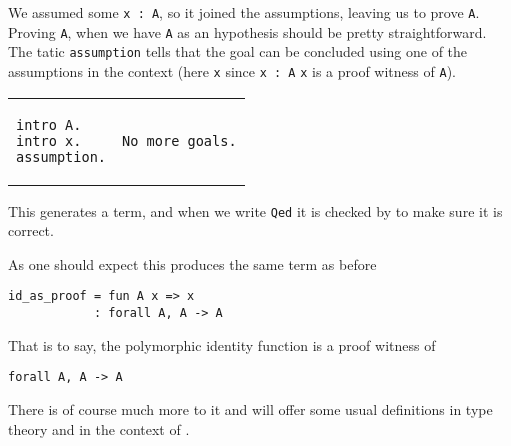 We assumed some \texttt{x : A}, so it joined the assumptions, leaving
us to prove \texttt{A}.
Proving \texttt{A}, when we have \texttt{A} as an hypothesis
should be pretty straightforward. The tatic \texttt{assumption}
tells \Coq that the goal can be concluded using one of the assumptions in the
context (here \texttt{x} since \texttt{x : A} \ie
\texttt{x} is a proof witness of \texttt{A}).

\begingroup
\centering
\begin{tabular}{p{}|p{}}
\begin{verbatim}
intro A.
intro x.
assumption.
\end{verbatim}
&
\begin{verbatim}
No more goals.
\end{verbatim}
\end{tabular}
\endgroup

This generates a term, and when we write \texttt{Qed} it is checked
by \Coq to make sure it is correct.

As one should expect this produces the same term as before
\begin{verbatim}
id_as_proof = fun A x => x
            : forall A, A -> A
\end{verbatim}
That is to say, the polymorphic identity function is a proof witness of
\begin{verbatim}
forall A, A -> A
\end{verbatim}

There is of course much more to it and  will offer some
usual definitions in type theory and in the context of \Coq.